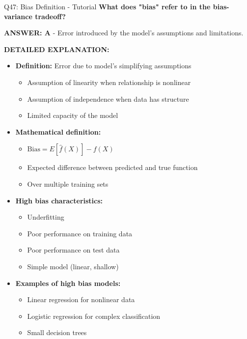 \documentclass[8pt]{beamer}
\begin{document}
	\begin{frame}{Q47: Bias Definition - Tutorial}
		\fontsize{6.5}{7.5}\selectfont
		\textbf{What does "bias" refer to in the bias-variance tradeoff?}
		
		\vspace{0.05cm}
		\textcolor{myblue}{\textbf{ANSWER: A}} - Error introduced by the model's assumptions and limitations.
		
		\vspace{0.05cm}
		\textbf{DETAILED EXPLANATION:}
		\begin{itemize}
			\item \textbf{Definition:} Error due to model's simplifying assumptions
			\begin{itemize}
				\item Assumption of linearity when relationship is nonlinear
				\item Assumption of independence when data has structure
				\item Limited capacity of the model
			\end{itemize}
			\item \textbf{Mathematical definition:}
			\begin{itemize}
				\item $\text{Bias} = E[\hat{f}(X)] - f(X)$
				\item Expected difference between predicted and true function
				\item Over multiple training sets
			\end{itemize}
			\item \textbf{High bias characteristics:}
			\begin{itemize}
				\item Underfitting
				\item Poor performance on training data
				\item Poor performance on test data
				\item Simple model (linear, shallow)
			\end{itemize}
			\item \textbf{Examples of high bias models:}
			\begin{itemize}
				\item Linear regression for nonlinear data
				\item Logistic regression for complex classification
				\item Small decision trees
			\end{itemize}
		\end{itemize}
		

\end{frame}
\end{document}
